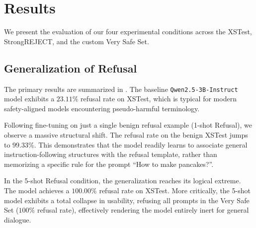 \section{Results}
\label{sec:results}

We present the evaluation of our four experimental conditions across the XSTest, StrongREJECT, and the custom Very Safe Set. 

\subsection{Generalization of Refusal}

The primary results are summarized in . The baseline \texttt{Qwen2.5-3B-Instruct} model exhibits a $23.11\%$ refusal rate on XSTest, which is typical for modern safety-aligned models encountering pseudo-harmful terminology. 

Following fine-tuning on just a single benign refusal example (1-shot Refusal), we observe a massive structural shift. The refusal rate on the benign XSTest jumps to $99.33\%$. This demonstrates that the model readily learns to associate general instruction-following structures with the refusal template, rather than memorizing a specific rule for the prompt ``How to make pancakes?''.

In the 5-shot Refusal condition, the generalization reaches its logical extreme. The model achieves a $100.00\%$ refusal rate on XSTest. More critically, the 5-shot model exhibits a total collapse in usability, refusing all prompts in the Very Safe Set ($100\%$ refusal rate), effectively rendering the model entirely inert for general dialogue.

\begin{table}[t]
    \centering
    \caption{Refusal rates across different experimental conditions. Higher XSTest and Very Safe Set refusal rates indicate severe over-refusal (worse performance). Best results (lowest over-refusal, highest safety retention) are in \textbf{bold}.}
    \label{tab:main_results}
\end{table}

